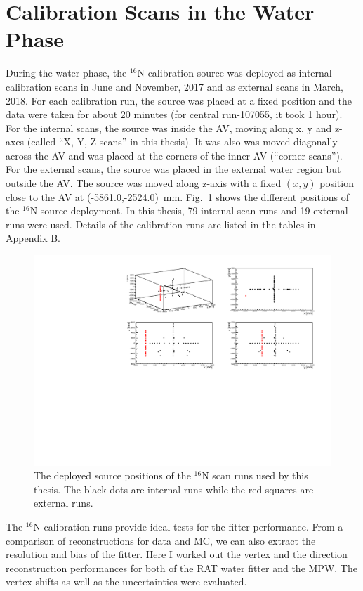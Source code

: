 \section{ Calibration Scans in the Water Phase}\label{sect:n16_water}
During the water phase, the $^{16}$N calibration source was deployed as internal calibration scans in June and November, 2017 and as external scans in March, 2018. For each calibration run, the source was placed at a fixed position and the data were taken for about 20 minutes (for central run-107055, it took 1 hour). For the internal scans, the source was inside the AV, moving along x, y and z-axes (called ``X, Y, Z scans'' in this thesis). It was also was moved diagonally across the AV and was placed at the corners of the inner AV (``corner scans''). For the external scans, the source was placed in the external water region but outside the AV. The source was moved along z-axis with a fixed $(x,y)$ position close to the AV at (-5861.0,-2524.0)~mm. Fig.~\ref{N16_3Dscan} shows the different positions of the $^{16}$N source deployment. In this thesis, 79 internal scan runs and 19 external runs were used. Details of the calibration runs are listed in the tables in Appendix B. 

\begin{figure}[!htb]
	\centering
	\includegraphics[width=15cm]{N16_3Dscan.pdf}
	\caption{The deployed source positions of the $^{16}$N scan runs used by this thesis. The black dots are internal runs while the red squares are external runs.}
	\label{N16_3Dscan}
\end{figure}

The $^{16}$N calibration runs provide ideal tests for the fitter performance. From a comparison of reconstructions for data and MC, we can also extract the resolution and bias of the fitter. Here I worked out the vertex and the direction reconstruction performances for both of the RAT water fitter and the MPW. The vertex shifts as well as the uncertainties were evaluated. 

